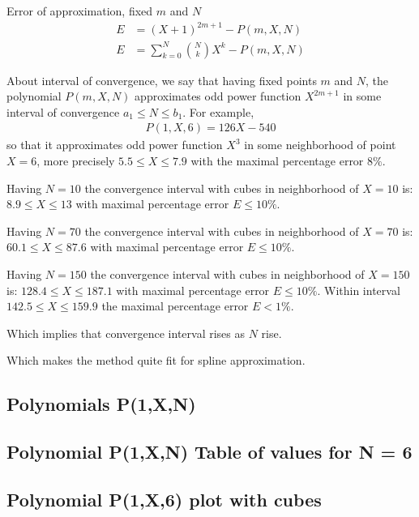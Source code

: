 \documentclass[12pt,letterpaper,oneside,reqno]{amsart}
\newcommand \polynomialP [4][P]{{#1}(#2,#3,#4)}
\begin{document}
    Error of approximation, fixed $m$ and $N$
    \begin{align*}
        E &= (X+1)^{2m+1} - \polynomialP{m}{X}{N} \\
        E &= \sum_{k=0}^{N} \binom{N}{k} X^k - \polynomialP{m}{X}{N}
    \end{align*}

    About interval of convergence, we say that having fixed points $m$ and $N$,
    the polynomial $\polynomialP{m}{X}{N}$ approximates odd power function $X^{2m+1}$ in some interval
    of convergence $a_1 \leq N \leq b_1$.
    For example,
    \begin{align*}
        \polynomialP{1}{X}{6} = 126X - 540
    \end{align*}
    so that it approximates odd power function $X^3$ in some neighborhood of point $X=6$, more precisely
    $5.5 \leq X \leq 7.9$ with the maximal percentage error $8\%$.

    Having $N=10$ the convergence interval with cubes in neighborhood of $X=10$ is: $8.9 \leq X \leq 13$
    with maximal percentage error $E \leq 10\%$.

    Having $N=70$ the convergence interval with cubes in neighborhood of $X=70$ is: $60.1 \leq X \leq 87.6$
    with maximal percentage error $E \leq 10\%$.

    Having $N=150$ the convergence interval with cubes in neighborhood of $X=150$ is: $128.4 \leq X \leq 187.1$
    with maximal percentage error $E \leq 10\%$.
    Within interval $142.5 \leq X \leq 159.9$ the maximal percentage error $E < 1\%$.

    Which implies that convergence interval rises as $N$ rise.

    Which makes the method quite fit for spline approximation.

    \clearpage

    \subsection{Polynomials P(1,X,N)}
    

    \subsection{Polynomial P(1,X,N) Table of values for N = 6}
    

    \subsection{Polynomial P(1,X,6) plot with cubes}
    
\end{document}
